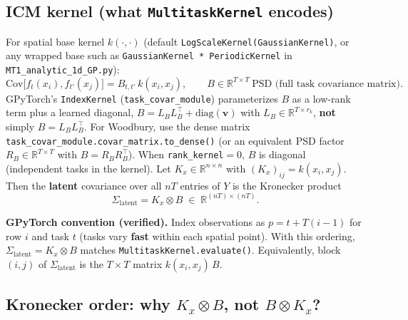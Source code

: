 \documentclass[11pt]{article}
\theoremstyle{plain}
\newcommand{\Sig}{\Sigma}
\newcommand{\LB}{L_B}
\newcommand{\RB}{R_B}
\begin{document}
\subsection{ICM kernel (what \texttt{MultitaskKernel} encodes)}

For spatial base kernel $k(\cdot,\cdot)$ (default \texttt{LogScaleKernel(GaussianKernel)},
or any wrapped base such as \texttt{GaussianKernel * PeriodicKernel} in \texttt{MT1\_analytic\_1d\_GP.py}):
\begin{equation}
  \label{eq:icm-element}
  \mathrm{Cov}\bigl[f_t(x_i), f_{t'}(x_j)\bigr] = B_{t,t'}\, k(x_i, x_j),
  \qquad
  B \in \mathbb{R}^{T \times T}\ \text{PSD (full task covariance matrix)}.
\end{equation}
GPyTorch's \texttt{IndexKernel} (\texttt{task\_covar\_module}) parameterizes $B$ as a
low-rank term plus a learned diagonal,
$B = \LB\LB^\top + \mathrm{diag}(\mathbf{v})$ with $\LB \in \mathbb{R}^{T \times r_k}$,
\textbf{not} simply $B = \LB\LB^\top$.
For Woodbury, use the dense matrix
\texttt{task\_covar\_module.covar\_matrix.to\_dense()} (or an equivalent PSD factor
$\RB \in \mathbb{R}^{T \times T}$ with $B = \RB\RB^\top$).
When \texttt{rank\_kernel}$=0$, $B$ is diagonal (independent tasks in the kernel).
Let $K_x \in \mathbb{R}^{n \times n}$ with $(K_x)_{ij} = k(x_i, x_j)$.
Then the \textbf{latent} covariance over all $nT$ entries of $Y$ is the Kronecker product
\begin{equation}
  \label{eq:kron-gpytorch}
  \boxed{
    \Sig_{\mathrm{latent}}
    = K_x \otimes B
    \;\in\; \mathbb{R}^{(nT)\times(nT)}.
  }
\end{equation}

\begin{samebox}
\textbf{GPyTorch convention (verified).}
Index observations as $p = t + T(i-1)$ for row $i$ and task $t$ (tasks vary \textbf{fast} within
each spatial point). With this ordering,
$\Sig_{\mathrm{latent}} = K_x \otimes B$ matches \texttt{MultitaskKernel.evaluate()}.
Equivalently, block $(i,j)$ of $\Sig_{\mathrm{latent}}$ is the $T\times T$ matrix $k(x_i,x_j)\,B$.
\end{samebox}

\subsection{Kronecker order: why $K_x \otimes B$, not $B \otimes K_x$?}
\label{sec:kron-order}
\end{document}
